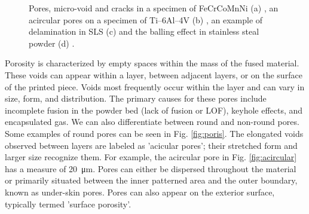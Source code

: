 \begin{figure}
{    }
    \qquad
    \qquad
    \caption[Defect examples in PBF.]{Pores, micro-void and cracks in a specimen of FeCrCoMnNi (a) \cite{mostafaei_defects_2022}, an acircular pores on a specimen of Ti–6Al–4V (b) \cite{tammas-williams_xct_2015}, an example of delamination in SLS (c) \cite{sames_metallurgy_2016} and the balling effect in stainless steal powder (d) \cite{li_balling_2012}.}
\end{figure} 
Porosity is characterized by empty spaces within the mass of the fused material. These voids can appear within a layer, between adjacent layers, or on the surface of the printed piece. Voids most frequently occur within the layer and can vary in size, form, and distribution. The primary causes for these pores include incomplete fusion in the powder bed (lack of fusion or LOF), keyhole effects, and encapsulated gas. We can also differentiate between round and non-round pores. Some examples of round pores can be seen in Fig. \ref{fig:poris}. The elongated voids observed between layers are labeled as 'acicular pores'; their stretched form and larger size recognize them. For example, the acircular pore in Fig. \ref{fig:acircular} has a measure of \SI{20}{\micro\metre}. Pores can either be dispersed throughout the material or primarily situated between the inner patterned area and the outer boundary, known as under-skin pores. Pores can also appear on the exterior surface, typically termed 'surface porosity'.
